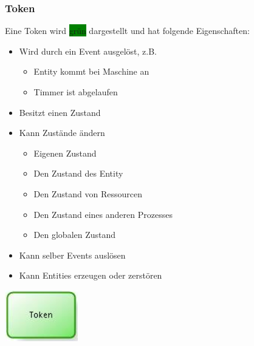 \subsubsection{Token}
\begin{minipage}[t]{0.7\textwidth}
Eine Token wird \colorbox{green}{grün} dargestellt und hat folgende Eigenschaften:
\begin{itemize}
    \item Wird durch ein Event ausgelöst, z.B.
    \begin{itemize}
        \item Entity kommt bei Maschine an
        \item Timmer ist abgelaufen
    \end{itemize}
    \item Besitzt einen Zustand
    \item Kann Zustände ändern
    \begin{itemize}
        \item Eigenen Zustand
        \item Den Zustand des Entity
        \item Den Zustand von Ressourcen
        \item Den Zustand eines anderen Prozesses
        \item Den globalen Zustand
    \end{itemize}
    \item Kann selber Events auslösen
    \item Kann Entities erzeugen oder zerstören
\end{itemize}
\end{minipage}
\begin{minipage}[t]{0.2\textwidth}
\includegraphics[width=0.6\linewidth]{images/simBPMN_token.png}
\end{minipage}

